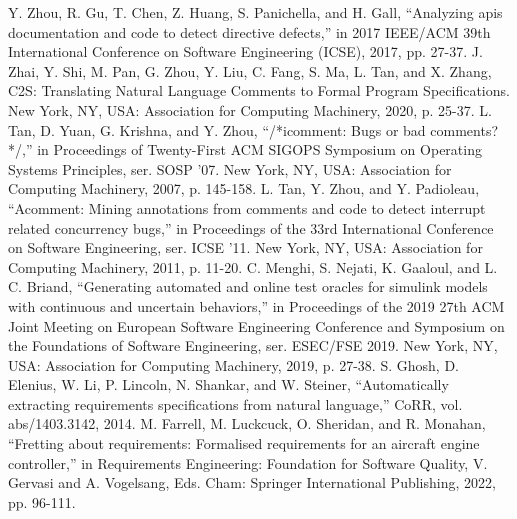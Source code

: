 \documentclass[uplatex, twocolumn,10pt]{jsarticle} %
\begin{document}
\begin{thebibliography}{99}
     Y. Zhou, R. Gu, T. Chen, Z. Huang, S. Panichella, and H. Gall, “Analyzing apis documentation and code to detect directive defects,” in 2017 IEEE/ACM 39th International Conference on Software Engineering (ICSE), 2017, pp. 27-37.
     J. Zhai, Y. Shi, M. Pan, G. Zhou, Y. Liu, C. Fang, S. Ma, L. Tan, and X. Zhang, C2S: Translating Natural Language Comments to Formal Program Specifications. New York, NY, USA: Association for Computing Machinery, 2020, p. 25-37.
     L. Tan, D. Yuan, G. Krishna, and Y. Zhou, “/*icomment: Bugs or bad comments?*/,” in Proceedings of Twenty-First ACM SIGOPS Symposium on Operating Systems Principles, ser. SOSP '07. New York, NY, USA: Association for Computing Machinery, 2007, p. 145-158.
     L. Tan, Y. Zhou, and Y. Padioleau, “Acomment: Mining annotations from comments and code to detect interrupt related concurrency bugs,” in Proceedings of the 33rd International Conference on Software Engineering, ser. ICSE '11. New York, NY, USA: Association for Computing Machinery, 2011, p. 11-20.
     C. Menghi, S. Nejati, K. Gaaloul, and L. C. Briand, “Generating automated and online test oracles for simulink models with continuous and uncertain behaviors,” in Proceedings of the 2019 27th ACM Joint Meeting on European Software Engineering Conference and Symposium on the Foundations of Software Engineering, ser. ESEC/FSE 2019. New York, NY, USA: Association for Computing Machinery, 2019, p. 27-38.
     S. Ghosh, D. Elenius, W. Li, P. Lincoln, N. Shankar, and W. Steiner, “Automatically extracting requirements specifications from natural language,” CoRR, vol. abs/1403.3142, 2014.
     M. Farrell, M. Luckcuck, O. Sheridan, and R. Monahan, “Fretting about requirements: Formalised requirements for an aircraft engine controller,” in Requirements Engineering: Foundation for Software Quality, V. Gervasi and A. Vogelsang, Eds. Cham: Springer International Publishing, 2022, pp. 96-111.
\end{thebibliography}
\end{document}
